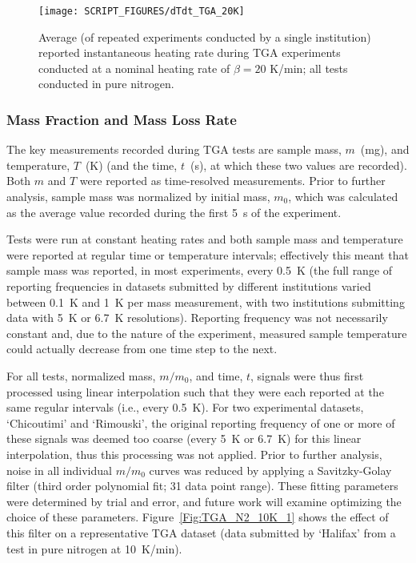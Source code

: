 \documentclass{book}
\begin{document}
\begin{figure}
  \centering
  \texttt{[image: SCRIPT\_FIGURES/dTdt\_TGA\_20K]}
  \caption{Average (of repeated experiments conducted by a single institution) reported instantaneous heating rate during TGA experiments conducted at a nominal heating rate of $\beta=20$ K/min; all tests conducted in pure nitrogen.}
  \label{Fig:dTdt_TGA_20K}
\end{figure}


\subsubsection{Mass Fraction and Mass Loss Rate}

The key measurements recorded during TGA tests are sample mass, $m$~(mg), and temperature, $T$~(K) (and the time, $t$~(s), at which these two values are recorded).  Both $m$ and $T$ were reported as time-resolved measurements. Prior to further analysis, sample mass was normalized by initial mass, $m_0$, which was calculated as the average value recorded during the first 5~s of the experiment.

Tests were run at constant heating rates and both sample mass and temperature were reported at regular time or temperature intervals; effectively this meant that sample mass was reported, in most experiments, every 0.5~K (the full range of reporting frequencies in datasets submitted by different institutions varied between 0.1~K and 1~K per mass measurement, with two institutions submitting data with 5~K or 6.7~K resolutions). Reporting frequency was not necessarily constant and, due to the nature of the experiment, measured sample temperature could actually decrease from one time step to the next.

For all tests, normalized mass, $m/m_0$, and time, $t$, signals were thus first processed using linear interpolation such that they were each reported at the same regular intervals (i.e., every 0.5~K). For two experimental datasets, ‘Chicoutimi’ and ‘Rimouski', the original reporting frequency of one or more of these signals was deemed too coarse (every 5~K or 6.7~K) for this linear interpolation, thus this processing was not applied.
Prior to further analysis, noise in all individual $m/m_0$ curves was reduced by applying a Savitzky-Golay filter (third order polynomial fit; 31 data point range). These fitting parameters were determined by trial and error, and future work will examine optimizing the choice of these parameters. Figure~\ref{Fig:TGA_N2_10K_1} shows the effect of this filter on a representative TGA dataset (data submitted by ‘Halifax’ from a test in pure nitrogen at 10~K/min).
\end{document}
